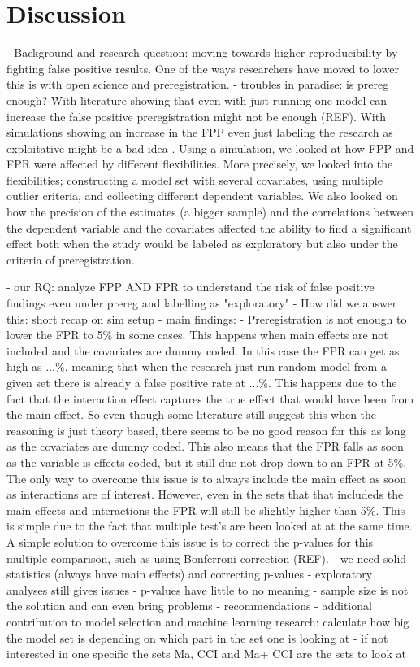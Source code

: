 \section{Discussion}

- Background and research question: moving towards higher reproducibility by fighting false positive results. One of the ways researchers have moved to lower this is with open science and preregistration. 
- troubles in paradise: is prereg enough?
With literature showing that even with just running one model can increase the false positive preregistration might not be enough (REF). 
With simulations showing an increase in the FPP even just labeling the research as exploitative might be a bad idea \citep{Simmons2011}. 
Using a simulation, we looked at how FPP and FPR were affected by different flexibilities. More precisely, we looked into the flexibilities; constructing a model set with several covariates, using multiple outlier criteria, and collecting different dependent variables. We also looked on how the precision of the estimates (a bigger sample) and the correlations between the dependent variable and the covariates affected the ability to find a significant effect both when the study would be labeled as exploratory but also under the criteria of preregistration. 


- our RQ: analyze FPP AND FPR to understand the risk of false positive findings even under prereg and labelling as "exploratory"
- How did we answer this: short recap on sim setup
- main findings:
	- Preregistration is not enough to lower the FPR to 5\%  in some cases. This happens when main effects are not included and the covariates are dummy coded. In this case the FPR can get as high as ...\%, meaning that when the research just run random model from a given set there is already a false positive rate at ...\%. This happens due to the fact that the interaction effect captures the true effect that would have been from the main effect. So even though some literature still suggest this when the reasoning is just theory based, there seems to be no good reason for this as long as the covariates are dummy coded. This also means that the FPR falls as soon as the variable is effects coded, but it still due not drop down to an FPR at 5\%. The only way to overcome this issue is to always include the main effect as soon as interactions are of interest. However, even in the sets that that includeds the main effects and interactions the FPR will still be slightly higher than 5\%. This is simple due to the fact that multiple test's are been looked at at the same time. A simple solution to overcome this issue is to correct the p-values for this multiple comparison, such as using Bonferroni correction (REF).
    - we need solid statistics (always have main effects) and correcting p-values 
	- exploratory analyses still gives issues - p-values have little to no meaning
	- sample size is not the solution and can even bring problems
- recommendations
- additional contribution to model selection and machine learning research: calculate how big the model set is depending on which part in the set one is looking at - if not interested in one specific the sets Ma, CCI and Ma+ CCI are the sets to look at

